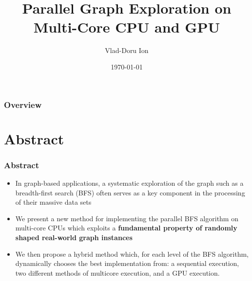 \documentclass{beamer}
\title[Parallel Graph Exploration]{Parallel Graph Exploration on Multi-Core CPU and GPU} %
\author{Vlad-Doru Ion} %
\institute[UNIBUC] %
{
University of Bucharest \\ %
\medskip
}
\date{\today} %
\begin{document}
\begin{frame}
\titlepage %
\end{frame}

\begin{frame}
\frametitle{Overview} %
\tableofcontents %
\end{frame}


\section{Abstract}

\begin{frame}
\frametitle{Abstract}
\begin{itemize}
\item In graph-based applications, a systematic exploration of the graph such as a breadth-first search (BFS) often serves as a key component in
the processing of their massive data sets
\item We present a new method for implementing the parallel BFS algorithm on multi-core CPUs which exploits a \textbf{fundamental property of randomly shaped real-world graph instances}
\item We then propose a hybrid method which, for each level of the BFS algorithm, dynamically chooses the best implementation from: a sequential execution, two different methods of multicore
execution, and a GPU execution.
\end{itemize}

\end{frame}


\end{document}
